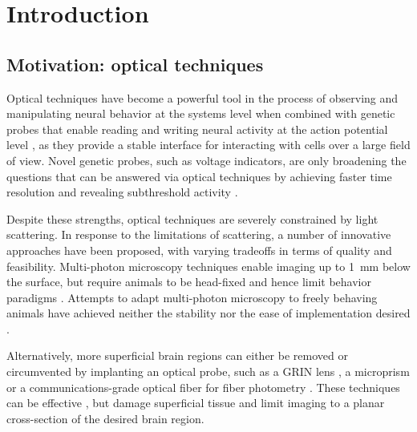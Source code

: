 \chapter{Introduction}
\label{chapter:intro}
\thispagestyle{myheadings}

\section{Motivation: optical techniques}
\label{sec:history}

Optical techniques have become a powerful tool in the process of observing and manipulating
neural behavior at the systems level when combined with genetic probes that enable reading 
and writing neural 
activity at the action potential level \cite{Emiliani:2015jl}, as they provide a stable 
interface for interacting with 
cells over a large field of view. Novel genetic probes, such as voltage 
indicators, are only broadening the questions that can be answered via optical techniques by achieving
faster time resolution and revealing subthreshold activity \cite{Gong:2015is}.

Despite these strengths, optical techniques are severely constrained by light scattering. In response to the limitations of scattering, 
a number of innovative approaches have been proposed, with varying tradeoffs in terms of quality and
feasibility. Multi-photon microscopy techniques enable imaging up to 1~mm below the surface, but
require animals to be head-fixed and hence limit behavior paradigms \cite{Horton:2013gxa}. 
Attempts to adapt multi-photon microscopy to freely behaving animals have achieved neither the
stability nor the ease of implementation desired \cite{Helmchen:2001tw,Flusberg:2005tq}.

Alternatively, more superficial brain regions can either be removed \cite{Dombeck:2010jr} or circumvented
by implanting an optical probe, such as a GRIN lens \cite{Barretto:2009hk}, a microprism \cite{Andermann:2013kc}
or a communications-grade optical fiber for fiber photometry \cite{Guo:2015gu}. These techniques can be 
effective \cite{Betley:2015cn}, but damage superficial tissue and limit imaging to a planar cross-section 
of the desired brain region. 

